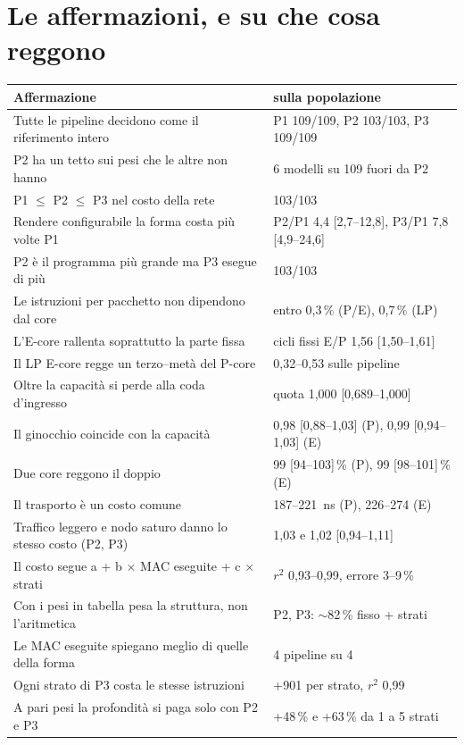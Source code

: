\documentclass[11pt,a4paper,oneside]{report}
\begin{document}
\section{Le affermazioni, e su che cosa reggono}

\begin{center}
\small
\begin{longtable}{@{}p{8.6cm}p{5.2cm}@{}}
\toprule
\textbf{Affermazione} & \textbf{sulla popolazione} \\
\midrule
\endhead
Tutte le pipeline decidono come il riferimento intero & P1 109/109, P2 103/103, P3 109/109 \\
P2 ha un tetto sui pesi che le altre non hanno & 6 modelli su 109 fuori da P2 \\
P1 $\leq$ P2 $\leq$ P3 nel costo della rete & 103/103 \\
Rendere configurabile la forma costa più volte P1 & P2/P1 4,4 [2,7--12,8], P3/P1 7,8 [4,9--24,6] \\
P2 è il programma più grande ma P3 esegue di più & 103/103 \\
Le istruzioni per pacchetto non dipendono dal core & entro 0,3\,\% (P/E), 0,7\,\% (LP) \\
L'E-core rallenta soprattutto la parte fissa & cicli fissi E/P 1,56 [1,50--1,61] \\
Il LP E-core regge un terzo--metà del P-core & 0,32--0,53 sulle pipeline \\
Oltre la capacità si perde alla coda d'ingresso & quota 1,000 [0,689--1,000] \\
Il ginocchio coincide con la capacità & 0,98 [0,88--1,03] (P), 0,99 [0,94--1,03] (E) \\
Due core reggono il doppio & 99 [94--103]\,\% (P), 99 [98--101]\,\% (E) \\
Il trasporto è un costo comune & 187--221~ns (P), 226--274 (E) \\
Traffico leggero e nodo saturo danno lo stesso costo (P2, P3) & 1,03 e 1,02 [0,94--1,11] \\
Il costo segue a + b $\times$ MAC eseguite + c $\times$ strati & $r^2$ 0,93--0,99, errore 3--9\,\% \\
Con i pesi in tabella pesa la struttura, non l'aritmetica & P2, P3: $\sim$82\,\% fisso + strati \\
Le MAC eseguite spiegano meglio di quelle della forma & 4 pipeline su 4 \\
Ogni strato di P3 costa le stesse istruzioni & +901 per strato, $r^2$ 0,99 \\
A pari pesi la profondità si paga solo con P2 e P3 & +48\,\% e +63\,\% da 1 a 5 strati \\

\end{longtable}
\end{center}
\end{document}
